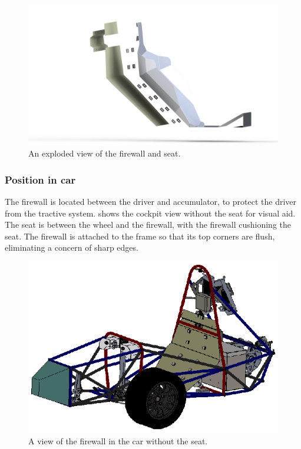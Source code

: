 \documentclass{article}
\begin{document}
\begin{figure}[H]
    \centering
    \includegraphics[width = 1 \textwidth]{firewall_exploded.png}
    \caption{An exploded view of the firewall and seat. }
    \label{fig:firewall_exploded}
\end{figure}

\subsubsection{Position in car}
The firewall is located between the driver and accumulator, to protect the driver from the tractive system.  shows the cockpit view without the seat for visual aid. The seat is between the wheel and the firewall, with the firewall cushioning the seat.  The firewall is attached to the frame so that its top corners are flush, eliminating a concern of sharp edges.

\begin{figure}[H]
    \centering
    \includegraphics[width = 1 \textwidth]{firewall_in_car.png}
    \caption{A view of the firewall in the car without the seat. }
    \label{fig:firewall_in_car}
\end{figure}
\end{document}
